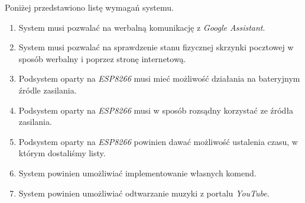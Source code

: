 Poniżej przedstawiono listę wymagań systemu.


\begin{enumerate}

\item System musi pozwalać na werbalną komunikację z \emph{Google Assistant}.
\item System musi pozwalać na sprawdzenie stanu fizycznej skrzynki pocztowej w sposób werbalny i poprzez stronę internetową.
\item Podsystem oparty na \emph{ESP8266} musi mieć możliwość działania na bateryjnym źródle zasilania.
\item Podsystem oparty na \emph{ESP8266} musi w sposób rozsądny korzystać ze źródła zasilania.
\item Podsystem oparty na \emph{ESP8266} powinien dawać możliwość ustalenia czasu, w którym dostaliśmy listy.
\item System powinien umożliwiać implementowanie własnych komend.
\item System powinien umożliwiać odtwarzanie muzyki z portalu \emph{YouTube}.

\end{enumerate}